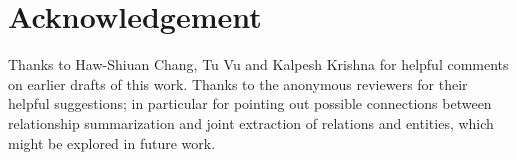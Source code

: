 \documentclass[11pt,a4paper]{article}
\begin{document}
\section{Acknowledgement}
Thanks to Haw-Shiuan Chang, Tu Vu and Kalpesh Krishna for helpful comments on earlier drafts of this work. Thanks to the anonymous reviewers for their helpful suggestions; in particular for pointing out possible  connections between relationship summarization and joint extraction of relations and entities, which might be explored in future work.





\end{document}
